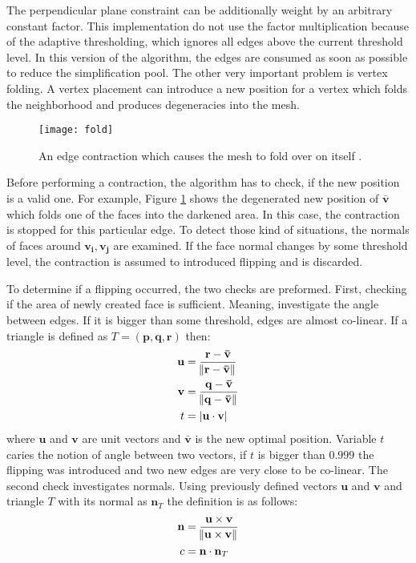 The perpendicular plane constraint can be additionally weight by an arbitrary constant factor. This implementation do not use the factor multiplication because of the adaptive thresholding, which ignores all edges above the current threshold level. In this version of the algorithm, the edges are consumed as soon as possible to reduce the simplification pool.
\newpage
The other very important problem is vertex folding. A vertex placement can introduce a new position for a vertex which folds the neighborhood and produces degeneracies into the mesh.

\begin{figure}[H]
  \begin{center}
    \texttt{[image: fold]}
    \caption{An edge contraction which causes the mesh to fold over on itself \cite{garland99}.}
    \label{fig:fold}
  \end{center}
\end{figure}

Before performing a contraction, the algorithm has to check, if the new position is a valid one. For example, Figure \ref{fig:fold} shows the degenerated new position of $\mathbf{\bar{v}}$ which folds one of the faces into the darkened area. In this case, the contraction is stopped for this particular edge. To detect those kind of situations, the normals of faces around $\mathbf{v_i}, \mathbf{v_j}$ are examined. If the face normal changes by some threshold level, the contraction is assumed to introduced flipping and is discarded. 

To determine if a flipping occurred, the two checks are preformed. First, checking if the area of newly created face is sufficient. Meaning, investigate the angle between edges. If it is bigger than some threshold, edges are almost co-linear. If a triangle is defined as $T = (\mathbf{p}, \mathbf{q}, \mathbf{r})$ then:
\begin{align}
\mathbf{u} &= \frac{\mathbf{r} - \mathbf{\bar{v}}}{\norm{\mathbf{r} - \mathbf{\bar{v}}}}\\
\mathbf{v} &= \frac{\mathbf{q} - \mathbf{\bar{v}}}{\norm{\mathbf{q} - \mathbf{\bar{v}}}}\\
t &= |\mathbf{u} \cdot \mathbf{v}|
\end{align}
where $\mathbf{u}$ and $\mathbf{v}$ are unit vectors and $\mathbf{\bar{v}}$ is the new optimal position. Variable $t$ caries the notion of angle between two vectors, if $t$ is bigger than $0.999$ the flipping was introduced and two new edges are very close to be co-linear.
\newpage
The second check investigates normals. Using previously defined vectors $\mathbf{u}$ and $\mathbf{v}$ and triangle $T$ with its normal as $\mathbf{n}_T$ the definition is as follows:
\begin{align}
\mathbf{n} &= \frac{ \mathbf{u} \times \mathbf{v}}{\norm{\mathbf{u} \times \mathbf{v}}}\\
c &= \mathbf{n} \cdot \mathbf{n}_T
\end{align}

